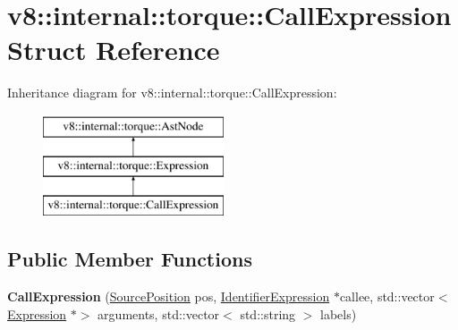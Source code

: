\hypertarget{structv8_1_1internal_1_1torque_1_1CallExpression}{}\section{v8\+:\+:internal\+:\+:torque\+:\+:Call\+Expression Struct Reference}
\label{structv8_1_1internal_1_1torque_1_1CallExpression}
Inheritance diagram for v8\+:\+:internal\+:\+:torque\+:\+:Call\+Expression\+:\begin{figure}[H]
\begin{center}
\leavevmode
\includegraphics[height=3.000000cm]{structv8_1_1internal_1_1torque_1_1CallExpression}
\end{center}
\end{figure}
\subsection*{Public Member Functions}
\begin{DoxyCompactItemize}
\item 
\mbox{\label{structv8_1_1internal_1_1torque_1_1CallExpression_a01763be2c2bb1d14d432d3ef4f39f336}} 
{\bfseries Call\+Expression} (\mbox{\hyperlink{structv8_1_1internal_1_1torque_1_1SourcePosition}{Source\+Position}} pos, \mbox{\hyperlink{structv8_1_1internal_1_1torque_1_1IdentifierExpression}{Identifier\+Expression}} $\ast$callee, std\+::vector$<$ \mbox{\hyperlink{structv8_1_1internal_1_1torque_1_1Expression}{Expression}} $\ast$$>$ arguments, std\+::vector$<$ std\+::string $>$ labels)
\end{DoxyCompactItemize}
